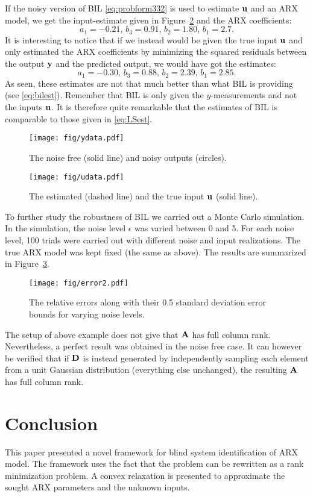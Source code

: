 \documentclass{ifacconf}
\newcommand{\DD}{{\bf D}}
\newcommand{\uu}{{\bf  u}}
\newcommand{\0}{{\bf 0}}
\newcommand{\yy}{{\bf y}}
\begin{document}
If the noisy version of  BIL \eqref{eq:probform332} is used to estimate $\uu$ and an ARX model, we get the input-estimate given in Figure~\ref{fig:udata} and the ARX
coefficients:
\begin{equation} \label{eq:bilest}
a_1=-0.21,\, b_3=0.91,\,   b_2=1.80,\,   b_1=2.7. 
\end{equation}
It is interesting to notice that if we instead would be given the true input
$\uu$ and only estimated the ARX coefficients by minimizing the squared
residuals between the output $\yy$ and the predicted output, we would
have got the estimates:   
\begin{equation} \label{eq:LSest}
a_1=-0.30,\, b_3=0.88,\,   b_2=2.39,\,   b_1=2.85. 
\end{equation}
As seen, these estimates are not that much better than what BIL is
providing (see \eqref{eq:bilest}). Remember that BIL is
only given the $y$-measurements and not the inputs $\uu$. It is
therefore quite remarkable that the estimates of BIL is comparable to
those given in \eqref{eq:LSest}. 
\begin{figure}
\texttt{[image: fig/ydata.pdf]}
\caption{The noise free (solid line) and noisy outputs (circles).}
\label{fig:ydata}
 \end{figure}
\begin{figure}
\texttt{[image: fig/udata.pdf]}
\caption{The estimated (dashed line) and the true input $\uu$ (solid line).}
\label{fig:udata}
 \end{figure}


To further study the robustness of BIL we carried out a Monte Carlo
simulation. In the simulation, the noise level $\epsilon$ was varied
between 0 and 5. For each noise level, 100 trials were carried out
with different noise and input realizations. The true ARX model was
kept fixed (the same as above). The results are summarized in
Figure~\ref{fig:error2}. 

\begin{figure}
 \texttt{[image: fig/error2.pdf]}
\caption{The relative errors along with their 0.5 standard deviation
  error bounds for varying noise levels.}
\label{fig:error2}
 \end{figure}

The setup of above example does not give that ${\bf A}$ has full
column rank. Nevertheless, a perfect result was obtained in the noise free
case.  It can however be verified that if  $\DD$ is instead generated by
independently sampling each element from a unit Gaussian distribution
(everything else unchanged),
the resulting ${\bf A}$ has full column rank.






\section{Conclusion}
This paper presented a novel framework for blind system identification
of ARX model. The framework uses the fact that the problem can be
rewritten as a rank minimization problem. A convex relaxation is
presented to approximate the sought ARX parameters and the unknown
inputs.  


\end{document}
